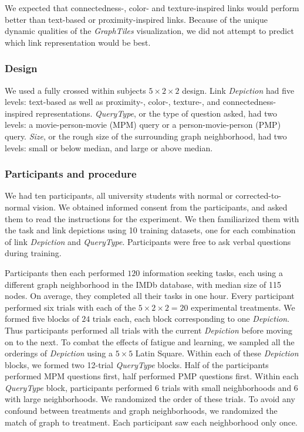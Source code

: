 \documentclass{sigchi}
\begin{document}
We expected that connectedness-, color- and texture-inspired links would perform better than text-based or proximity-inspired links. Because of the unique dynamic qualities of the \textit{GraphTiles} visualization, we did not attempt to predict which link representation would be best.

\subsubsection{Design}

We used a fully crossed within subjects $5 \times 2 \times 2$ design. Link \textit{Depiction} had five levels: text-based as well as proximity-, color-, texture-, and connectedness-inspired representations. \textit{QueryType}, or the type of question asked, had two levels: a movie-person-movie (MPM) query or a person-movie-person (PMP) query. \textit{Size}, or the rough size of the surrounding graph neighborhood, had two levels: small or below median, and large or above median.


\subsubsection{Participants and procedure}

We had ten participants, all university students with normal or corrected-to-normal vision. We obtained informed consent from the participants, and asked them to read the instructions for the experiment. We then familiarized them with the task and link depictions using 10 training datasets, one for each combination of link \textit{Depiction} and \textit{QueryType}. Participants were free to ask verbal questions during training.

Participants then each performed $120$ information seeking tasks, each using a different graph neighborhood in the IMDb database, with median size of 115 nodes. On average, they completed all their tasks in one hour. Every participant performed six trials with each of the $5 \times 2 \times 2 = 20$ experimental treatments. We formed five blocks of $24$ trials each, each block corresponding to one \textit{Depiction}. Thus participants performed all trials with the current \textit{Depiction} before moving on to the next. To combat the effects of fatigue and learning, we sampled all the orderings of \textit{Depiction} using a $5 \times 5$ Latin Square. Within each of these \textit{Depiction} blocks, we formed two 12-trial \textit{QueryType} blocks. Half of the participants performed MPM questions first, half performed PMP questions first. Within each \textit{QueryType} block, participants performed 6 trials with small neighborhoods and 6 with large neighborhoods. We randomized the order of these trials. To avoid any confound between treatments and graph neighborhoods, we randomized the match of graph to treatment. Each participant saw each neighborhood only once.
\end{document}
